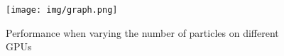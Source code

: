 \begin{figure}[H]
\hspace*{-2.1cm}
  \label{fig:graph}
  \centering
  \texttt{[image: img/graph.png]}
  \caption{Performance when varying the number of particles on different GPUs}
\end{figure}


